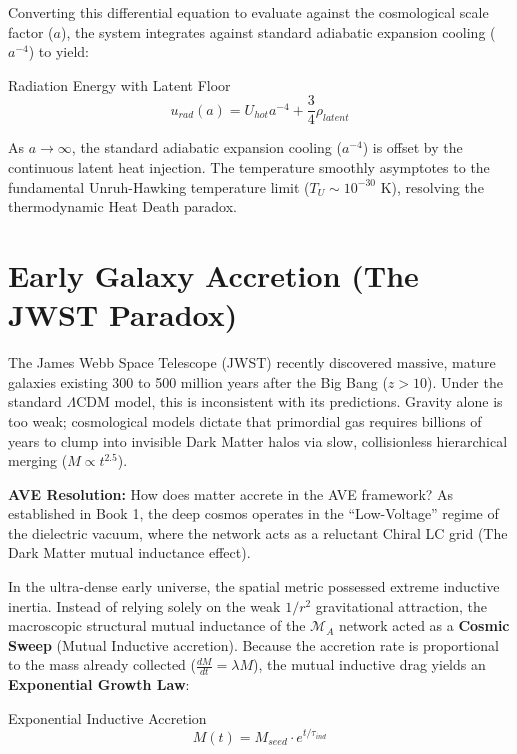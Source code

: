 Converting this differential equation to evaluate against the cosmological scale factor ($a$), the system integrates against standard adiabatic expansion cooling ($a^{-4}$) to yield:

\begin{resultbox}{Radiation Energy with Latent Floor}
\begin{equation}
u_{rad}(a) = U_{hot}a^{-4} + \frac{3}{4}\rho_{latent}
\end{equation}
\end{resultbox}

As $a \to \infty$, the standard adiabatic expansion cooling ($a^{-4}$) is offset by the continuous latent heat injection. The temperature smoothly asymptotes to the fundamental Unruh-Hawking temperature limit ($T_U \sim 10^{-30}\text{ K}$), resolving the thermodynamic Heat Death paradox.

\section{Early Galaxy Accretion (The JWST Paradox)}
The James Webb Space Telescope (JWST) recently discovered massive, mature galaxies existing 300 to 500 million years after the Big Bang ($z > 10$). Under the standard $\Lambda$CDM model, this is inconsistent with its predictions. Gravity alone is too weak; cosmological models dictate that primordial gas requires billions of years to clump into invisible Dark Matter halos via slow, collisionless hierarchical merging ($M \propto t^{2.5}$).

\textbf{AVE Resolution:} How does matter accrete in the AVE framework? As established in Book 1, the deep cosmos operates in the ``Low-Voltage'' regime of the dielectric vacuum, where the network acts as a reluctant Chiral LC grid (The Dark Matter mutual inductance effect). 

In the ultra-dense early universe, the spatial metric possessed extreme inductive inertia. Instead of relying solely on the weak $1/r^2$ gravitational attraction, the macroscopic structural mutual inductance of the $\mathcal{M}_A$ network acted as a \textbf{Cosmic Sweep} (Mutual Inductive accretion). Because the accretion rate is proportional to the mass already collected ($\frac{dM}{dt} = \lambda M$), the mutual inductive drag yields an \textbf{Exponential Growth Law}:
\begin{resultbox}{Exponential Inductive Accretion}
\begin{equation}
    M(t) = M_{seed} \cdot e^{t / \tau_{ind}}
\end{equation}
\end{resultbox}

